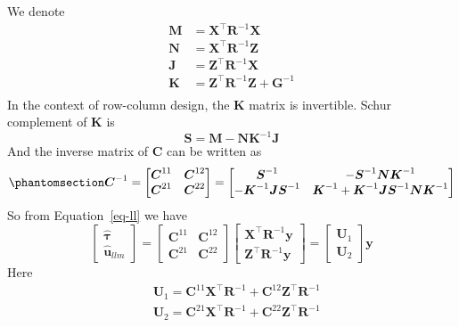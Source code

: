 \documentclass[
  a4paper,
  oneside,
  openany,
  12pt,
  onecolumn]{book}
\theoremstyle{definition}
\theoremstyle{plain}
\theoremstyle{remark}
\begin{document}
We denote \[\begin{aligned}
\boldsymbol{M} &= \boldsymbol{X}^\top \boldsymbol{R}^{-1} \boldsymbol{X}\\
\boldsymbol{N} &= \boldsymbol{X}^\top \boldsymbol{R}^{-1} \boldsymbol{Z}\\
\boldsymbol{J} &= \boldsymbol{Z}^\top \boldsymbol{R}^{-1} \boldsymbol{X}\\
\boldsymbol{K} &= \boldsymbol{Z}^\top \boldsymbol{R}^{-1} \boldsymbol{Z} + \boldsymbol{G}^{-1}\\
\end{aligned}\] In the context of row-column design, the
\(\boldsymbol{K}\) matrix is invertible. Schur complement of
\(\boldsymbol{K}\) is \[
\boldsymbol{S} = \boldsymbol{M} - \boldsymbol{N} \boldsymbol{K}^{-1} \boldsymbol{J}
\] And the inverse matrix of \(\boldsymbol{C}\) can be written as
\begin{equation}\phantomsection\label{eq-iv}{
\boldsymbol{C}^{-1}=
\begin{bmatrix}
\boldsymbol{C}^{11} & \boldsymbol{C}^{12} \\
\boldsymbol{C}^{21} & \boldsymbol{C}^{22}
\end{bmatrix}=
\begin{bmatrix}
\boldsymbol{S}^{-1} & -\boldsymbol{S}^{-1} \boldsymbol{N} \boldsymbol{K}^{-1} \\
-\boldsymbol{K}^{-1} \boldsymbol{J} \boldsymbol{S}^{-1} & \boldsymbol{K}^{-1} + \boldsymbol{K}^{-1} \boldsymbol{J} \boldsymbol{S}^{-1} \boldsymbol{N} \boldsymbol{K}^{-1}
\end{bmatrix}
}\end{equation} So from Equation~\ref{eq-ll} we have \[
\begin{bmatrix}
\hat{\boldsymbol{\tau}} \\
\hat{\boldsymbol{u}}_{llm}
\end{bmatrix}
=
\begin{bmatrix}
\boldsymbol{C}^{11} & \boldsymbol{C}^{12} \\
\boldsymbol{C}^{21} & \boldsymbol{C}^{22}
\end{bmatrix}
\begin{bmatrix}
\boldsymbol{X}^\top\boldsymbol{R}^{-1}\boldsymbol{y}\\
\boldsymbol{Z}^\top\boldsymbol{R}^{-1}\boldsymbol{y}
\end{bmatrix}
=
\begin{bmatrix}
\boldsymbol{U}_1\\
\boldsymbol{U}_2
\end{bmatrix}\boldsymbol{y}
\] Here \[\begin{aligned}
&\boldsymbol{U}_1 = \boldsymbol{C}^{11}\boldsymbol{X}^\top\boldsymbol{R}^{-1}+\boldsymbol{C}^{12}\boldsymbol{Z}^\top\boldsymbol{R}^{-1}\\
&\boldsymbol{U}_2 = \boldsymbol{C}^{21}\boldsymbol{X}^\top\boldsymbol{R}^{-1}+\boldsymbol{C}^{22}\boldsymbol{Z}^\top\boldsymbol{R}^{-1}
\end{aligned}\]
\end{document}
